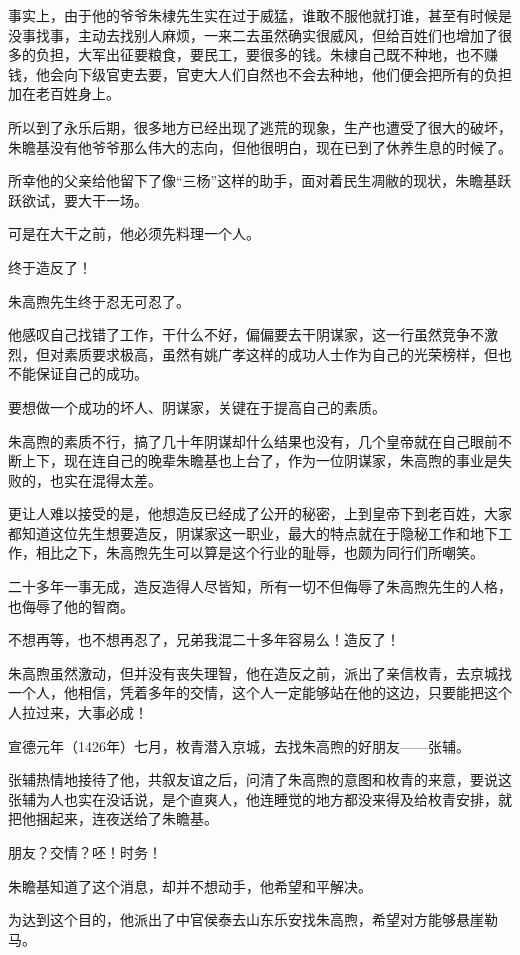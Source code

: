 \begin{multicols}{\theparacolNo}
事实上，由于他的爷爷朱棣先生实在过于威猛，谁敢不服他就打谁，甚至有时候是没事找事，主动去找别人麻烦，一来二去虽然确实很威风，但给百姓们也增加了很多的负担，大军出征要粮食，要民工，要很多的钱。朱棣自己既不种地，也不赚钱，他会向下级官吏去要，官吏大人们自然也不会去种地，他们便会把所有的负担加在老百姓身上。

所以到了永乐后期，很多地方已经出现了逃荒的现象，生产也遭受了很大的破坏，朱瞻基没有他爷爷那么伟大的志向，但他很明白，现在已到了休养生息的时候了。

所幸他的父亲给他留下了像“三杨”这样的助手，面对着民生凋敝的现状，朱瞻基跃跃欲试，要大干一场。

可是在大干之前，他必须先料理一个人。

终于造反了！

朱高煦先生终于忍无可忍了。

他感叹自己找错了工作，干什么不好，偏偏要去干阴谋家，这一行虽然竞争不激烈，但对素质要求极高，虽然有姚广孝这样的成功人士作为自己的光荣榜样，但也不能保证自己的成功。

要想做一个成功的坏人、阴谋家，关键在于提高自己的素质。

朱高煦的素质不行，搞了几十年阴谋却什么结果也没有，几个皇帝就在自己眼前不断上下，现在连自己的晚辈朱瞻基也上台了，作为一位阴谋家，朱高煦的事业是失败的，也实在混得太差。

更让人难以接受的是，他想造反已经成了公开的秘密，上到皇帝下到老百姓，大家都知道这位先生想要造反，阴谋家这一职业，最大的特点就在于隐秘工作和地下工作，相比之下，朱高煦先生可以算是这个行业的耻辱，也颇为同行们所嘲笑。

二十多年一事无成，造反造得人尽皆知，所有一切不但侮辱了朱高煦先生的人格，也侮辱了他的智商。

不想再等，也不想再忍了，兄弟我混二十多年容易么！造反了！

朱高煦虽然激动，但并没有丧失理智，他在造反之前，派出了亲信枚青，去京城找一个人，他相信，凭着多年的交情，这个人一定能够站在他的这边，只要能把这个人拉过来，大事必成！

宣德元年（1426年）七月，枚青潜入京城，去找朱高煦的好朋友——张辅。

张辅热情地接待了他，共叙友谊之后，问清了朱高煦的意图和枚青的来意，要说这张辅为人也实在没话说，是个直爽人，他连睡觉的地方都没来得及给枚青安排，就把他捆起来，连夜送给了朱瞻基。

朋友？交情？呸！时务！

朱瞻基知道了这个消息，却并不想动手，他希望和平解决。

为达到这个目的，他派出了中官侯泰去山东乐安找朱高煦，希望对方能够悬崖勒马。


\end{multicols}
